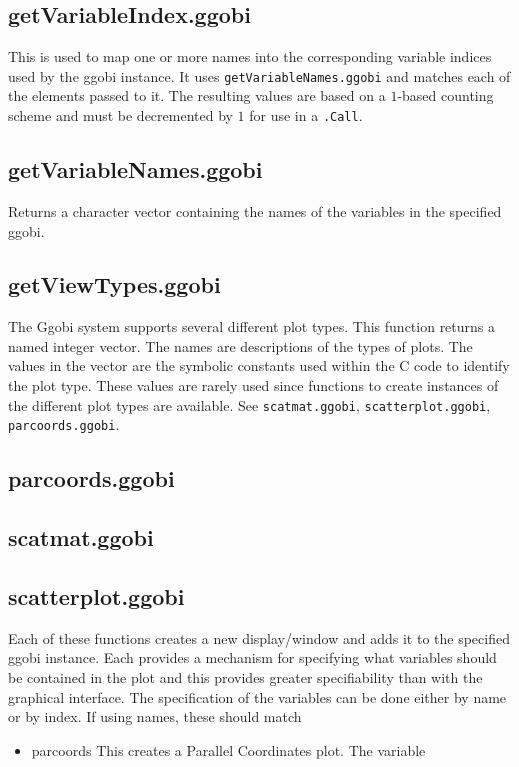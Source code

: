 \documentclass{article}
\def\SFunction#1{{\texttt{\red #1}}}
\begin{document}
\subsection{getVariableIndex.ggobi}
This is used to map one or more names into the corresponding variable
indices used by the ggobi instance.  It uses
\SFunction{getVariableNames.ggobi} and matches each of the elements
passed to it.  The resulting values are based on a $1$-based counting
scheme and must be decremented by $1$ for use in a \SFunction{.Call}.

\subsection{getVariableNames.ggobi}
Returns  a character vector containing the names of the variables in
the specified ggobi.

\subsection{getViewTypes.ggobi}
The Ggobi system supports several different plot types. This function
returns a named integer vector. The names are descriptions of the
types of plots.  The values in the vector are the symbolic constants
used within the C code to identify the plot type.  These values are
rarely used since functions to create instances of the different plot
types are available.  See \SFunction{scatmat.ggobi},
\SFunction{scatterplot.ggobi}, \SFunction{parcoords.ggobi}.

\subsection{parcoords.ggobi}
\subsection{scatmat.ggobi}
\subsection{scatterplot.ggobi}
Each of these functions creates a new display/window and adds it to
the specified ggobi instance.  Each provides a mechanism for
specifying what variables should be contained in the plot and this
provides greater specifiability than with the graphical interface.
The specification of the variables can be done either by 
name or by index.
If using names, these should match
\begin{itemize}
\item{parcoords}
This creates a Parallel Coordinates plot.
The variable
\end{itemize}
\end{document}
